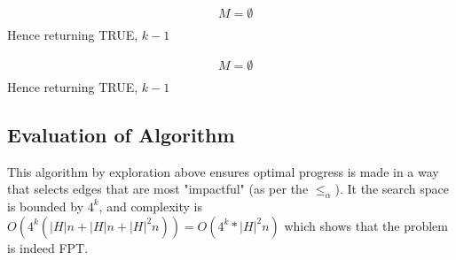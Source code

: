 \documentclass{article}
\begin{document}
\noindent\begin{minipage}{.5\linewidth}
\begin{align*}
  &M = \emptyset \\
\end{align*}
Hence returning TRUE, $k-1$
\end{minipage}%
\begin{minipage}{.5\linewidth}
\begin{align*}
  &M = \emptyset \\
\end{align*}
Hence returning TRUE, $k-1$
\end{minipage}

\subsection*{Evaluation of Algorithm}
This algorithm by exploration above ensures optimal progress is made in a way that selects edges that are most "impactful" (as per the $\leq_{\alpha}$). It the search space is bounded by $4^k$, and complexity is $O(4^k(|H|n + |H|n + |H|^2n)) = O(4^k * |H|^2n)$ which shows that the problem is indeed FPT.
\end{document}
